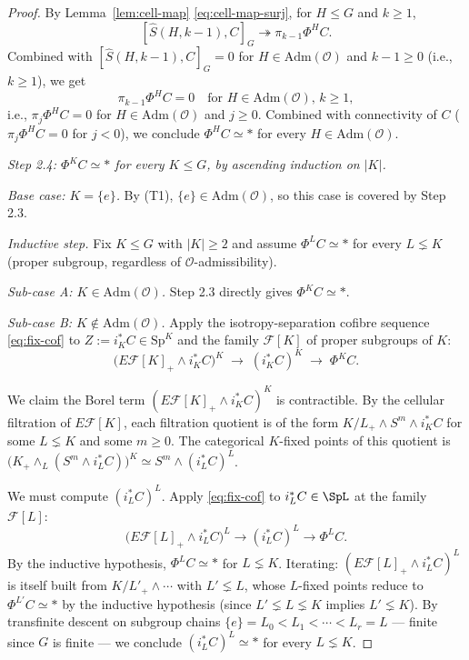 \documentclass[12pt]{article}
\theoremstyle{definition}
\newcommand{\SpK}{\mathrm{Sp}^{K}}
\newcommand{\PhiH}{\Phi^{H}}
\newcommand{\PhiK}{\Phi^{K}}
\newcommand{\OO}{\mathcal{O}}
\newcommand{\admis}{\mathrm{Adm}}
\newcommand{\Esub}[1]{E\mathcal{F}[#1]}
\begin{document}
\begin{proof}
By Lemma~\ref{lem:cell-map} \eqref{eq:cell-map-surj}, for $H\leq G$ and
$k\geq 1$,
\[
[\widehat{S}(H,k-1),C]_{G}\twoheadrightarrow\pi_{k-1}\PhiH C.
\]
Combined with $[\widehat{S}(H,k-1),C]_{G}=0$ for $H\in\admis(\OO)$ and
$k-1\geq 0$ (i.e., $k\geq 1$), we get
\[
\pi_{k-1}\PhiH C=0\quad\text{for }H\in\admis(\OO),\,k\geq 1,
\]
i.e., $\pi_{j}\PhiH C=0$ for $H\in\admis(\OO)$ and $j\geq 0$.
Combined with connectivity of $C$ ($\pi_{j}\PhiH C=0$ for $j<0$), we conclude
$\PhiH C\simeq\ast$ for every $H\in\admis(\OO)$.

\smallskip
\noindent\emph{Step 2.4: $\PhiK C\simeq\ast$ for every $K\leq G$, by ascending induction on $|K|$.}

\emph{Base case: $K=\{e\}$.} By (T1), $\{e\}\in\admis(\OO)$, so this case is
covered by Step 2.3.

\emph{Inductive step.} Fix $K\leq G$ with $|K|\geq 2$ and assume
$\Phi^{L}C\simeq\ast$ for every $L\lneq K$ (proper subgroup, regardless of
$\OO$-admissibility).

\smallskip
\emph{Sub-case A: $K\in\admis(\OO)$.} Step 2.3 directly gives
$\PhiK C\simeq\ast$.

\smallskip
\emph{Sub-case B: $K\notin\admis(\OO)$.} Apply the isotropy-separation cofibre
sequence \eqref{eq:fix-cof} to $Z:=i_{K}^{\ast}C\in\SpK$ and the family
$\mathcal{F}[K]$ of proper subgroups of $K$:
\begin{equation}
\bigl(\Esub{K}_{+}\wedge i_{K}^{\ast}C\bigr)^{K}
\;\longrightarrow\;(i_{K}^{\ast}C)^{K}
\;\longrightarrow\;\PhiK C.
\label{eq:K-isotrop}
\end{equation}

We claim the Borel term $(\Esub{K}_{+}\wedge i_{K}^{\ast}C)^{K}$ is
contractible. By the cellular filtration of $\Esub{K}$, each filtration
quotient is of the form $K/L_{+}\wedge S^{m}\wedge i_{K}^{\ast}C$ for some
$L\lneq K$ and some $m\geq 0$. The categorical $K$-fixed points of this
quotient is
$\bigl(K_{+}\wedge_{L}(S^{m}\wedge i_{L}^{\ast}C)\bigr)^{K}\simeq
S^{m}\wedge(i_{L}^{\ast}C)^{L}$.

We must compute $(i_{L}^{\ast}C)^{L}$. Apply \eqref{eq:fix-cof} to
$i_{L}^{\ast}C\in\SpL$ at the family $\mathcal{F}[L]$:
\[
\bigl(\Esub{L}_{+}\wedge i_{L}^{\ast}C\bigr)^{L}\to (i_{L}^{\ast}C)^{L}
\to\Phi^{L}C.
\]
By the inductive hypothesis, $\Phi^{L}C\simeq\ast$ for $L\lneq K$.
Iterating: $(\Esub{L}_{+}\wedge i_{L}^{\ast}C)^{L}$ is itself built from
$K/L'_{+}\wedge\cdots$ with $L'\lneq L$, whose $L$-fixed points reduce to
$\Phi^{L'}C\simeq\ast$ by the inductive hypothesis (since $L'\lneq L\lneq K$
implies $L'\lneq K$). By transfinite descent on subgroup chains
$\{e\}=L_{0}<L_{1}<\cdots<L_{r}=L$ — finite since $G$ is finite — we conclude
$(i_{L}^{\ast}C)^{L}\simeq\ast$ for every $L\lneq K$.


\end{proof}
\end{document}
